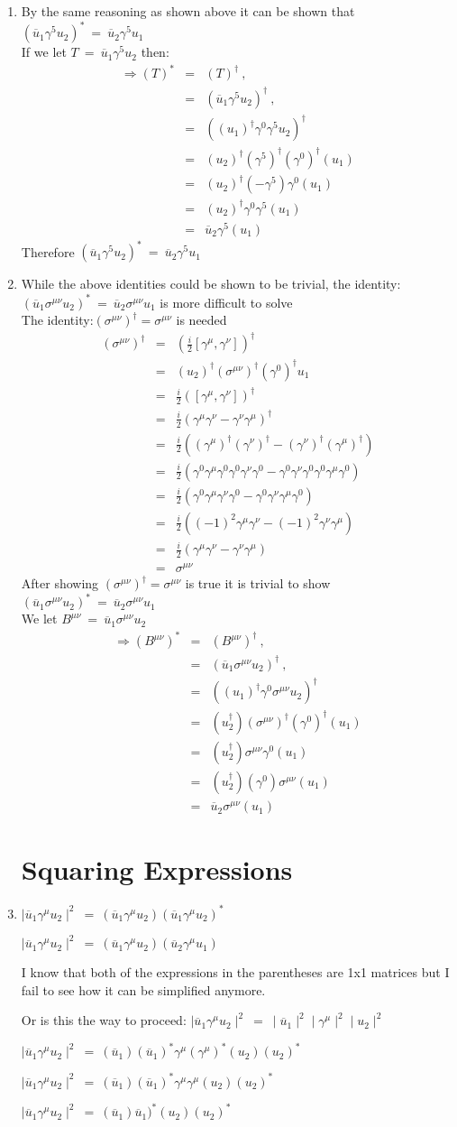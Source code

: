 \documentclass[12pt]{article}
\def \bea{\begin{eqnarray}}
\def \eea{\end{eqnarray}}
\def \nn{\nonumber}
\def \nl{\nn \\}
\def \ou{\overline{u}}
\def \ga{\gamma}
\def \si{\sigma}
\begin{document}
\begin{enumerate}
\item By the same reasoning as shown above it can be shown that $(\ou_1 \ga^5 u_2)^* ~=~ \ou_2 \ga^5 u_1$ \nl
If we let $T ~=~ \ou_1\ga^5 u_2$ then: 
\bea
\Rightarrow (T)^* &=& (T)^\dag ~,~~ \nl
&=& (\ou_1\ga^5 u_2)^\dag ~,~~ \nl
&=& ((u_1)^\dag\ga^0\ga^5 u_2)^\dag \nl
&=& (u_2)^\dag(\ga^5)^\dag (\ga^0)^\dag(u_1)\nl
&=& (u_2)^\dag(-\ga^5) \ga^0(u_1)\nl
&=& (u_2)^\dag \ga^0\ga^5(u_1)\nl
&=& \ou_2\ga^5(u_1) \nonumber
\eea \nonumber
Therefore  $(\ou_1 \ga^5 u_2)^* ~=~ \ou_2 \ga^5 u_1$

\item While the above identities could be shown to be trivial, the identity: $(\ou_1 \si^{\mu\nu} u_2)^* ~=~\ou_2 \si^{\mu\nu} u_1$ is more difficult to solve \nl
The identity:$(\si^{\mu\nu})^\dag =\si^{\mu\nu}$ is needed
\bea \nonumber
(\si^{\mu\nu})^\dag &=& (\frac{i}{2}[\ga^\mu,\ga^\nu])^\dag \nl
&=&(u_2)^\dag (\si^{\mu\nu})^\dag (\ga^0)^\dag u_1 \nl
&=& \frac{i}{2}([\ga^\mu,\ga^\nu])^\dag\nl
&=& \frac{i}{2}(\ga^\mu\ga^\nu-\ga^\nu\ga^\mu)^\dag \nl
&=& \frac{i}{2}((\ga^\mu)^\dag(\ga^\nu)^\dag-(\ga^\nu)^\dag(\ga^\mu)^\dag) \nl
&=& \frac{i}{2}(\ga^0\ga^\mu\ga^0\ga^0\ga^\nu\ga^0-\ga^0\ga^\nu\ga^0\ga^0\ga^\mu\ga^0)\nl
&=& \frac{i}{2}(\ga^0\ga^\mu\ga^\nu\ga^0-\ga^0\ga^\nu \ga^\mu\ga^0)\nl
&=& \frac{i}{2}((-1)^2\ga^\mu\ga^\nu-(-1)^2\ga^\nu \ga^\mu) \nl
&=& \frac{i}{2}(\ga^\mu\ga^\nu-\ga^\nu \ga^\mu)\nl
&=& \si^{\mu\nu}
\eea \nonumber
After showing $(\si^{\mu\nu})^\dag =\si^{\mu\nu}$ is true it is trivial to show $(\ou_1 \si^{\mu\nu} u_2)^* ~=~\ou_2 \si^{\mu\nu} u_1$ \nl
We let $B^{\mu\nu} ~=~ \ou_1 \si^{\mu\nu} u_2$ 
\bea
\Rightarrow (B^{\mu\nu})^* &=& (B^{\mu\nu})^\dag ~,~~ \nl
&=& (\ou_1 \si^{\mu\nu} u_2)^\dag ~,~~ \nl
&=& ((u_1)^\dag \ga^0 \si^{\mu\nu} u_2)^\dag \nl
&=& (u_2^\dag)(\si^{\mu\nu})^\dag (\ga^0)^\dag(u_1)\nl
&=& (u_2^\dag)\si^{\mu\nu}\ga^0(u_1)\nl
&=& (u_2^\dag)(\ga^0)\si^{\mu\nu}(u_1)\nl
&=& \ou_2 \si^{\mu\nu}(u_1) \nonumber
\eea \nonumber


\section{Squaring Expressions}
\item $\mid \ou_1 \ga^\mu u_2 \mid^2 ~=~ (\ou_1 \ga^\mu u_2)(\ou_1 \ga^\mu u_2 )^*$

$\mid \ou_1 \ga^\mu u_2 \mid^2 ~=~ (\ou_1 \ga^\mu u_2)(\ou_2 \ga^\mu u_1)$

I know that both of the expressions in the parentheses are 1x1 matrices but I fail to see how it can be simplified anymore.

Or is this the way to proceed:
$\mid \ou_1 \ga^\mu u_2 \mid^2 ~=~ \mid\ou_1\mid^2 \mid\ga^\mu\mid^2 \mid u_2 \mid^2$

$\mid \ou_1 \ga^\mu u_2 \mid^2 ~=~ (\ou_1)(\overline{u}_1)^*\ga^\mu (\ga^\mu)^* (u_2)(u_2)^*$

$\mid \ou_1 \ga^\mu u_2 \mid^2 ~=~ (\ou_1)(\ou_1)^*\ga^\mu \ga^\mu (u_2)(u_2)^*$

$\mid \ou_1 \ga^\mu u_2 \mid^2 ~=~ (\ou_1)\ou_1)^* (u_2)(u_2)^*$

\end{enumerate}
\end{document}
